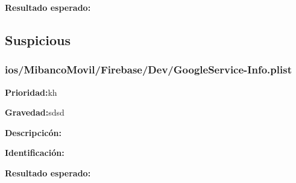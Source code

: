 \documentclass{article}
\begin{document}
            \endgroup

            \begingroup
            \noindent
            \leftskip 35pt 
            \rightskip 0pt 
            \vspace{10pt}
            \textbf{Resultado esperado:}
        
            \endgroup
        \subsection{Suspicious}
        \subsubsection{ios/MibancoMovil/Firebase/Dev/GoogleService-Info.plist}
        \begingroup
        \noindent
        \leftskip 35pt 
        \rightskip 0pt 
        \vspace{10pt}
        \textbf{Prioridad:}kh

        \endgroup

        \begingroup
        \noindent
        \leftskip 35pt 
        \rightskip 0pt 
        \vspace{10pt}
        \textbf{Gravedad:}sdsd

        \endgroup
            
        \begingroup
        \noindent
        \leftskip 35pt 
        \rightskip 0pt 
        \vspace{10pt}
        \textbf{Descripcicón:}
    
        \endgroup

        \begingroup
        \noindent
        \leftskip 35pt 
        \rightskip 0pt 
        \vspace{10pt}
        \textbf{Identificación:}
        
        \endgroup

        \begingroup
        \noindent
        \leftskip 35pt 
        \rightskip 0pt 
        \vspace{10pt}
        \textbf{Resultado esperado:}
    
        \endgroup
\end{document}
